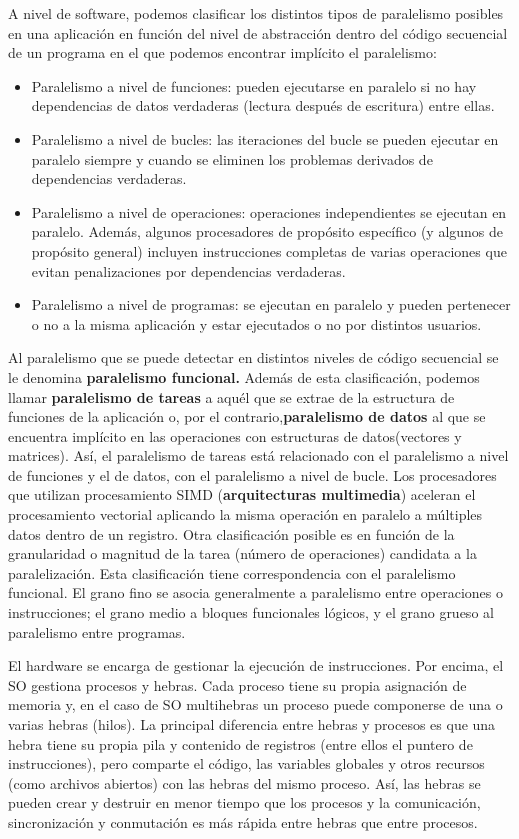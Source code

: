 \documentclass[a4paper, 11pt]{article}
\begin{document}
A nivel de software, podemos clasificar los distintos tipos de paralelismo posibles en una aplicación en función del nivel de abstracción dentro del código secuencial de un programa en el que podemos encontrar implícito el paralelismo: 
\begin{itemize}

 \item Paralelismo a nivel de funciones: pueden ejecutarse en paralelo si no hay dependencias de datos verdaderas (lectura después de escritura) entre ellas.
 \item Paralelismo a nivel de bucles: las iteraciones del bucle se pueden ejecutar en paralelo siempre y cuando se eliminen los problemas derivados de dependencias verdaderas.
 \item Paralelismo a nivel de operaciones: operaciones independientes se ejecutan en paralelo. Además, algunos procesadores de propósito específico (y algunos de propósito general) incluyen instrucciones completas de varias operaciones que evitan penalizaciones por dependencias verdaderas. 
 \item Paralelismo a nivel de programas: se ejecutan en paralelo y pueden pertenecer o no a la misma aplicación y estar ejecutados o no por distintos usuarios.
\end{itemize}

Al paralelismo que se puede detectar en distintos niveles de código secuencial se le denomina \textbf{paralelismo funcional.} Además de esta clasificación, podemos llamar \textbf{paralelismo de tareas} a aquél que se extrae de la estructura de funciones de la aplicación o, por el contrario,\textbf{paralelismo de datos} al que se encuentra implícito en las operaciones con estructuras de datos(vectores y matrices). Así, el paralelismo de tareas está relacionado con el paralelismo a nivel de funciones y el de datos, con el paralelismo a nivel de bucle. Los procesadores que utilizan procesamiento SIMD (\textbf{arquitecturas multimedia}) aceleran el procesamiento vectorial aplicando la misma operación en paralelo a múltiples datos dentro de un registro. Otra clasificación posible es en función de la granularidad o magnitud de la tarea (número de operaciones) candidata a la paralelización. Esta clasificación tiene correspondencia con el paralelismo funcional. El grano fino se asocia generalmente a paralelismo entre operaciones o instrucciones; el grano medio a bloques funcionales lógicos, y el grano grueso al paralelismo entre programas.

El hardware se encarga de gestionar la ejecución de instrucciones. Por encima, el SO gestiona procesos y hebras. Cada proceso tiene su propia asignación de memoria y, en el caso de SO multihebras un proceso puede componerse de una o varias hebras (hilos). La principal diferencia entre hebras y procesos es que una hebra tiene su propia pila y contenido de registros (entre ellos el puntero de instrucciones), pero comparte el código, las variables globales y otros recursos (como archivos abiertos) con las hebras del mismo proceso. Así, las hebras se pueden crear y destruir en menor tiempo que los procesos y la comunicación, sincronización y conmutación es más rápida entre hebras que entre procesos.
\end{document}
